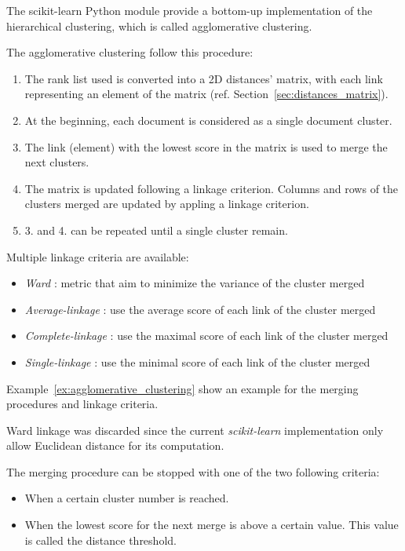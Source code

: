 The scikit-learn Python module \cite{sklearn} provide a bottom-up implementation of the hierarchical clustering, which is called agglomerative clustering.

The agglomerative clustering follow this procedure:
\begin{enumerate}
  \item The rank list used is converted into a 2D distances' matrix, with each link representing an element of the matrix (ref. Section~\ref{sec:distances_matrix}).
  \item At the beginning, each document is considered as a single document cluster.
  \item The link (element) with the lowest score in the matrix is used to merge the next clusters.
  \item The matrix is updated following a linkage criterion. Columns and rows of the clusters merged are updated by appling a linkage criterion.
  \item 3. and 4. can be repeated until a single cluster remain.
\end{enumerate}

Multiple linkage criteria are available:

\begin{itemize}
  \item
  \textit{Ward} : metric that aim to minimize the variance of the cluster merged
  \item
  \textit{Average-linkage} : use the average score of each link of the cluster merged
  \item
  \textit{Complete-linkage} : use the maximal score of each link of the cluster merged
  \item
  \textit{Single-linkage} : use the minimal score of each link of the cluster merged
\end{itemize}

Example~\ref{ex:agglomerative_clustering} show an example for the merging procedures and linkage criteria.

Ward linkage was discarded since the current \textit{scikit-learn} implementation only allow Euclidean distance for its computation.

The merging procedure can be stopped with one of the two following criteria:

\begin{itemize}
  \item
  When a certain cluster number is reached.
  \item
  When the lowest score for the next merge is above a certain value. This value is called the distance threshold.
\end{itemize}


